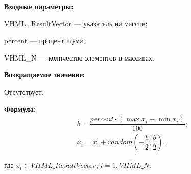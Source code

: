 \textbf{Входные параметры:}  

 VHML\_ResultVector --- указатель на массив;
 
 percent --- процент шума;
 
 VHML\_N --- количество элементов в массивах.

\textbf{Возвращаемое значение:}

Отсутствует.

\textbf{Формула:}
\begin{eqnarray*}
b=\dfrac{percent\cdot\left( \max{x_i}-\min{x_i}\right)}{100};\\
x_i=x_i+random \left( -\dfrac{b}{2},\dfrac{b}{2}\right),
\end{eqnarray*}

где $x_i \in VHML\_ResultVector$, $i=\overline{1,VHML\_N}$.